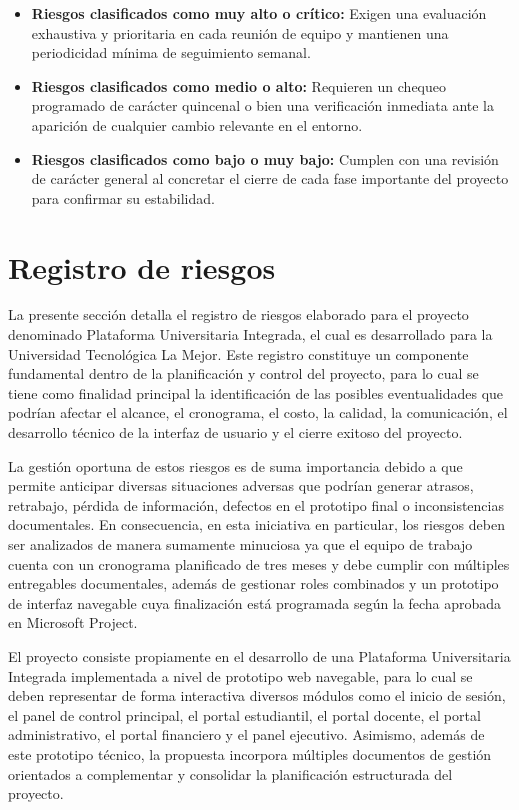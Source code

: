 \documentclass[11pt,spanish]{article}
\begin{document}
\begin{itemize}
    \item \textbf{Riesgos clasificados como muy alto o crítico:} Exigen una evaluación exhaustiva y prioritaria en cada reunión de equipo y mantienen una periodicidad mínima de seguimiento semanal.
    \item \textbf{Riesgos clasificados como medio o alto:} Requieren un chequeo programado de carácter quincenal o bien una verificación inmediata ante la aparición de cualquier cambio relevante en el entorno.
    \item \textbf{Riesgos clasificados como bajo o muy bajo:} Cumplen con una revisión de carácter general al concretar el cierre de cada fase importante del proyecto para confirmar su estabilidad.
\end{itemize}

\newpage
\section{Registro de riesgos}

La presente sección detalla el registro de riesgos elaborado para el proyecto denominado Plataforma Universitaria Integrada, el cual es desarrollado para la Universidad Tecnológica La Mejor. Este registro constituye un componente fundamental dentro de la planificación y control del proyecto, para lo cual se tiene como finalidad principal la identificación de las posibles eventualidades que podrían afectar el alcance, el cronograma, el costo, la calidad, la comunicación, el desarrollo técnico de la interfaz de usuario y el cierre exitoso del proyecto.

La gestión oportuna de estos riesgos es de suma importancia debido a que permite anticipar diversas situaciones adversas que podrían generar atrasos, retrabajo, pérdida de información, defectos en el prototipo final o inconsistencias documentales. En consecuencia, en esta iniciativa en particular, los riesgos deben ser analizados de manera sumamente minuciosa ya que el equipo de trabajo cuenta con un cronograma planificado de tres meses y debe cumplir con múltiples entregables documentales, además de gestionar roles combinados y un prototipo de interfaz navegable cuya finalización está programada según la fecha aprobada en Microsoft Project.

El proyecto consiste propiamente en el desarrollo de una Plataforma Universitaria Integrada implementada a nivel de prototipo web navegable, para lo cual se deben representar de forma interactiva diversos módulos como el inicio de sesión, el panel de control principal, el portal estudiantil, el portal docente, el portal administrativo, el portal financiero y el panel ejecutivo. Asimismo, además de este prototipo técnico, la propuesta incorpora múltiples documentos de gestión orientados a complementar y consolidar la planificación estructurada del proyecto.
\end{document}
